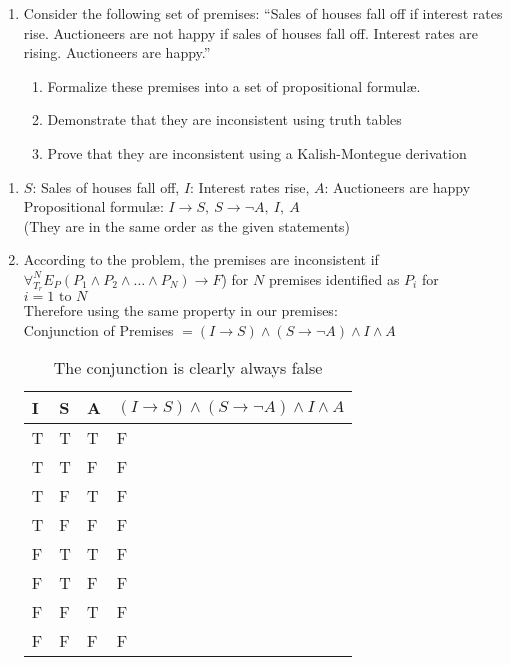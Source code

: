 \documentclass[10.5pt]{article}
\newenvironment{solution}[2][Solution]{ \begin{trivlist}
\item[\hskip \labelsep {\bfseries #1}]}{\end{trivlist}}
\newenvironment{problem}[2][Problem]{\begin{trivlist}
\item[\hskip \labelsep {\bfseries #1}\hskip \labelsep {\bfseries #2.}]}{\end{trivlist}}
\begin{document}
\begin{problem}{5}
\begin{enumerate}
\item Consider the following set of premises: ``Sales of houses fall off if interest rates rise. Auctioneers are not happy if sales of houses fall off. Interest rates are rising. Auctioneers are happy.''
  \begin{enumerate}
  \item Formalize these premises into a set of propositional formul{\ae}.
  \item Demonstrate that they are inconsistent using truth tables
  \item Prove that they are inconsistent using a Kalish-Montegue derivation
  \end{enumerate}
\end{enumerate}
\end{problem}
\begin{solution}{5}
\item[]
\begin{enumerate}[label=(\alph*)]
  \itemsep=0in
\item $S$: Sales of houses fall off, $I$: Interest rates rise, $A$: Auctioneers are happy \\
Propositional formul\ae: $I \rightarrow S,\ S \rightarrow \lnot A,\ I,\ A$ \\ (They are in the same order as the given statements)
\item According to the problem, the premises are inconsistent if $\forall_{T_r}^N E_P(P_1 \wedge P_2 \wedge \ldots \wedge P_N) \rightarrow F$) for $N$ premises identified as $P_i$ for $i = 1 \mbox{ to } N$ \\ Therefore using the same property in our premises:\\
Conjunction of Premises $= (I \rightarrow S) \wedge (S \rightarrow \lnot A) \wedge I \wedge A$ \\

\begin{table}[!h]
\centering
\caption{The conjunction is clearly always false}
\label{my-label}
\begin{tabular}{|l|l|l|l|}
\hline
I & S & A & $(I \rightarrow S) \wedge (S \rightarrow \lnot A) \wedge I \wedge A$ \\ \hline
T & T & T & F \\ \hline
T & T & F & F \\ \hline
T & F & T & F \\ \hline
T & F & F & F \\ \hline
F & T & T & F \\ \hline
F & T & F & F \\ \hline
F & F & T & F \\ \hline
F & F & F & F \\ \hline
\end{tabular}
\end{table}


\end{enumerate}
\end{solution}
\end{document}
